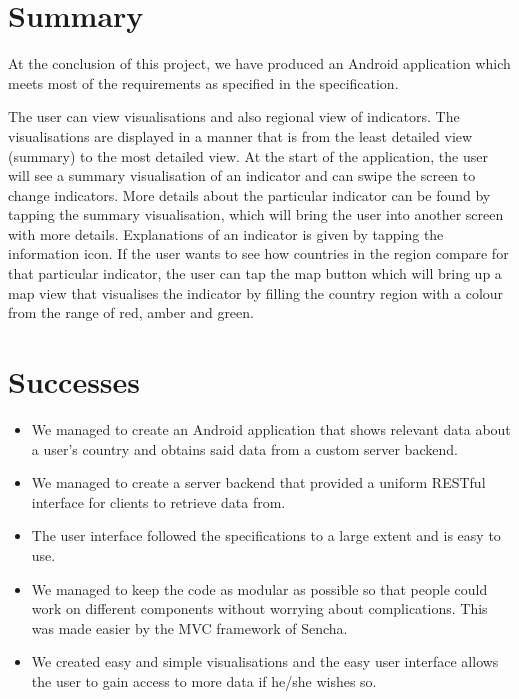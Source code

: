 \documentclass[12pt,a4paper,twoside]{article}
\begin{document}

\newpage
\thispagestyle{empty}
\cleardoublepage
\newpage

\section{Summary}

At the conclusion of this project, we have produced an Android application which meets most of the requirements as specified in the specification.

The user can view visualisations and also regional view of indicators. The visualisations are displayed in a manner that is from the least detailed view (summary) to the most detailed view. At the start of the application, the user will see a summary visualisation of an indicator and can swipe the screen to change indicators. More details about the particular indicator can be found by tapping the summary visualisation, which will bring the user into another screen with more details. Explanations of an indicator is given by tapping the information icon. If the user wants to see how countries in the region compare for that particular indicator, the user can tap the map button which will bring up a map view that visualises the indicator by filling the country region with a colour from the range of red, amber and green.

\section{Successes}

\begin{itemize}
	\item We managed to create an Android application that shows relevant data about a user’s country and obtains said data from a custom server backend.
	\item We managed to create a server backend that provided a uniform RESTful interface for clients to retrieve data from.
	\item The user interface followed the specifications to a large extent and is easy to use.
	\item We managed to keep the code as modular as possible so that people could work on different components without worrying about complications. This was made easier by the MVC framework of Sencha.
	\item We created easy and simple visualisations and the easy user interface allows the user to gain access to more data if he/she wishes so.
\end{itemize}
\end{document}
